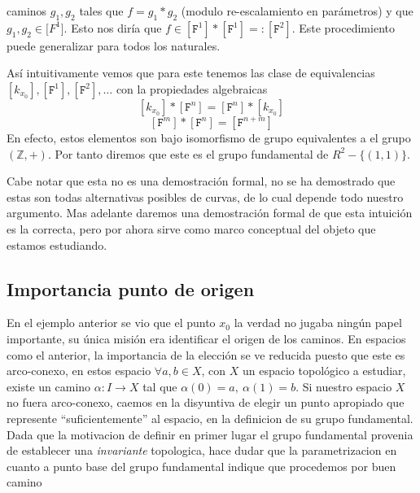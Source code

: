 {\begin{itemize}
  caminos \(g_1, g_2\) tales que \(f = g_1 * g_2\) (modulo re-escalamiento
  en parámetros) y que \(g_1, g_2 \in \mathtt [F ^1]\). Esto nos diría que
  \( f \in [\mathtt F ^1] * [\mathtt F ^1] =: [\mathtt F ^2]\). Este
  procedimiento puede generalizar para todos los naturales.
\end{itemize}
Así intuitivamente vemos que para este tenemos las clase de
equivalencias \([k_{x_0}], [\mathtt F ^1], [\mathtt F ^2], \dots \) con
la propiedades algebraicas
\[ [k_{x_0}] * [\mathtt F ^n] = [\mathtt F ^n] * [k_{x_0}]\]
\[ [\mathtt F ^m]  * [\mathtt F ^n] = [\mathtt F ^{n + m}]\]
En efecto, estos elementos son bajo isomorfismo de grupo equivalentes a
el grupo \((\mathbb{Z}, +)\). Por tanto diremos que este es el grupo
fundamental de \(R^2 - \{(1,1)\}\).

Cabe notar que esta no es una demostración formal, no se ha demostrado
que estas son todas alternativas posibles de curvas, de lo cual depende
todo nuestro argumento. Mas adelante daremos una demostración formal de
que esta intuición es la correcta, pero por ahora sirve como marco
conceptual del objeto que estamos estudiando.

\subsection{Importancia punto de origen}
En el ejemplo anterior se vio que el punto \(x_0\) la verdad no
jugaba ningún papel importante, su única misión era identificar el
origen de los caminos. En espacios como el anterior, la importancia de
la elección se ve reducida puesto que este es arco-conexo, en estos
espacio \(\forall a,b \in X\), con \(X\) un espacio topológico a
estudiar, existe un camino \(\alpha : I \to X\) tal que \(\alpha (0) =
a,\ \alpha (1) = b\). Si nuestro espacio \(X\) no fuera arco-conexo,
caemos en la disyuntiva de elegir un punto apropiado que represente
``suficientemente'' al espacio, en la definicion de su grupo
fundamental. Dada que la motivacion de definir en primer lugar el grupo
fundamental provenia de establecer una \emph{invariante} topologica,
hace dudar que la parametrizacion en cuanto a punto base del grupo
fundamental indique que procedemos por buen camino

}
